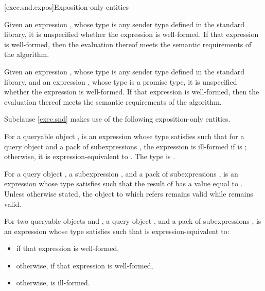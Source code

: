 [exec.snd.expos]{Exposition-only entities}

\pnum
Given an expression ,
whose type is any sender type defined in the standard library,
it is unspecified
whether the expression  is well-formed.
If that expression is well-formed,
then the evaluation thereof meets the semantic requirements of
the  algorithm.

\pnum
Given an expression ,
whose type is any sender type defined in the standard library,
and an expression ,
whose type is a promise type,
it is unspecified
whether the expression  is well-formed.
If that expression is well-formed,
then the evaluation thereof meets the semantic requirements of
the  algorithm.



\pnum
Subclause \ref{exec.snd} makes use of the following exposition-only entities.

\pnum
{}%
For a queryable object ,
 is an expression
whose type satisfies 
such that for a query object  and
a pack of subexpressions ,
the expression  is ill-formed
if  is ;
otherwise, it is expression-equivalent to .
%
The type  is
.

\pnum
For a query object ,
a subexpression , and
a pack of subexpressions ,
 is an expression 
whose type satisfies 
such that the result of  has
a value equal to .
Unless otherwise stated,
the object to which  refers remains valid
while  remains valid.

\pnum
For two queryable objects  and ,
a query object , and
a pack of subexpressions ,
 is an expression 
whose type satisfies 
such that  is expression-equivalent to:
\begin{itemize}
\item
{} if that expression is well-formed,
\item
otherwise,  if that expression is well-formed,
\item
otherwise,  is ill-formed.
\end{itemize}

